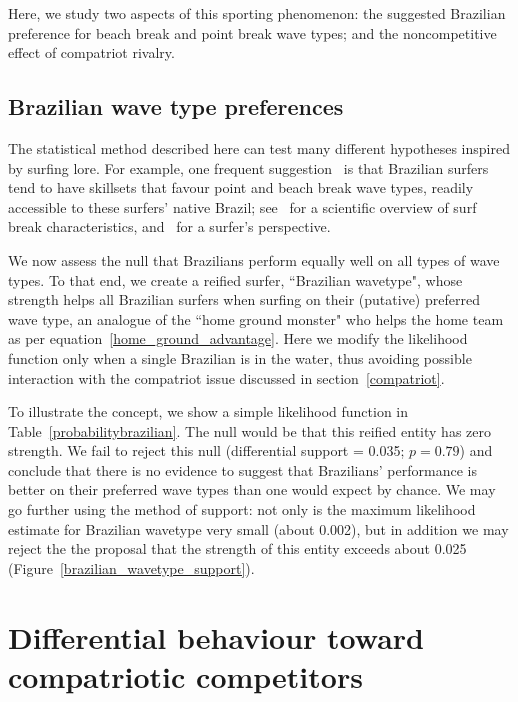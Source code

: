 \documentclass{article}
\begin{document}
Here, we study two aspects of this sporting phenomenon: the suggested
Brazilian preference for beach break and point break wave types; and the
noncompetitive effect of compatriot rivalry.

\subsection{Brazilian wave type preferences}

The statistical method described here can test many different
hypotheses inspired by surfing lore.  For example, one frequent
suggestion~\citep{burgess2020,ho2021} is that Brazilian surfers tend to
have skillsets that favour point and beach break wave types, readily
accessible to these surfers' native Brazil; see~\citet{scarfe2003} for
a scientific overview of surf break characteristics,
and~\citet{butt2004} for a surfer's perspective.

We now assess the null that Brazilians perform equally well on all
types of wave types.  To that end, we create a reified surfer,
``Brazilian wavetype", whose strength helps all Brazilian surfers
when surfing on their (putative) preferred wave type, an analogue of
the ``home ground monster" who helps the home team as per
equation~\ref{home_ground_advantage}.  Here we modify the likelihood
function only when a single Brazilian is in the water, thus avoiding
possible interaction with the compatriot issue discussed in
section~\ref{compatriot}.

To illustrate the concept, we show a simple likelihood function in
Table~\ref{probabilitybrazilian}.  The null would be that this reified
entity has zero strength.  We fail to reject this null (differential
support = 0.035; $p=0.79$) and conclude that there is no evidence to
suggest that Brazilians' performance is better on their preferred wave
types than one would expect by chance.  We may go further using the
method of support: not only is the maximum likelihood estimate for
Brazilian wavetype very small (about 0.002), but in addition we may
reject the the proposal that the strength of this entity exceeds about
0.025 (Figure~\ref{brazilian_wavetype_support}).

\section{Differential \label{compatriot} behaviour toward compatriotic competitors}
\end{document}
